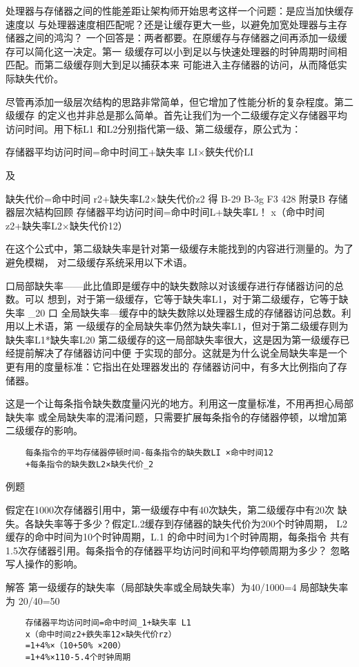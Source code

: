 处理器与存储器之间的性能差距让架构师开始思考这样一个问题：是应当加快缓存速度以
与处理器速度相匹配呢？还是让缓存更大一些，以避免加宽处理器与主存储器之间的鸿沟？
一个回答是：两者都要。在原缓存与存储器之间再添加一级缓存可以简化这一决定。第一
级缓存可以小到足以与快速处理器的时钟周期时间相匹配。而第二级缓存则大到足以捕获本来
可能进入主存储器的访问，从而降低实际缺失代价。

尽管再添加一级层次结构的思路非常简单，但它增加了性能分析的复杂程度。第二级缓存
的定义也并非总是那么简单。首先让我们为一个二级缓存定义存储器平均访问时间。用下标L1
和L2分别指代第一级、第二级缓存，原公式为：

存储器平均访问时间=命中时间工+缺失率 LI×鋏失代价LI

及

缺失代价=命中时间 r2+缺失率L2×缺失代价z2
得
B-29
B-3g
F3
428
附录B 存储器层次結构回顾
存储器平均访问时间=命中时间L+缺失率L！
x（命中时间 z2+缺失率L2×缺失代价12）

在这个公式中，第二级缺失率是针对第一级缓存未能找到的内容进行测量的。为了避免模糊，
对二级缓存系统采用以下术语。

口局部缺失率——此比值即是缓存中的缺失数除以对该缓存进行存储器访问的总数。可以
想到，对于第一级缓存，它等于缺失率L1，对于第二级缓存，它等于缺失率 \_20
口 全局缺失率—缓存中的缺失数除以处理器生成的存储器访问总数。利用以上术语，第
一级缓存的全局缺失率仍然为缺失率L1，但对于第二级缓存则为缺失率L1*缺失率L20
第二级缓存的这一局部缺失率很大，这是因为第一级缓存已经提前解决了存储器访问中便
于实现的部分。这就是为什么说全局缺失率是一个更有用的度量标准：它指出在处理器发出的
存储器访问中，有多大比例指向了存储器。

这是一个让每条指令缺失数度量闪光的地方。利用这一度量标准，不用再担心局部缺失率
或全局缺失率的混淆问题，只需要扩展每条指令的存储器停顿，以增加第二级缓存的影响。
\begin{verbatim}
    每条指令的平均存储器停顿时间-每条指令的缺失数LI ×命中时间12
    +每条指令的缺失数L2×缺失代价_2
\end{verbatim}

例题


假定在1000次存储器引用中，第一级缓存中有40次缺失，第二级缓存中有20次
缺失。各缺失率等于多少？假定L.2缓存到存储器的缺失代价为200个时钟周期，
L2缓存的命中时间为10个时钟周期，L.1 的命中时间为1个时钟周期，每条指令
共有1.5次存储器引用。每条指令的存储器平均访问时间和平均停顿周期为多少？
忽略写人操作的影响。

解答
第一级缓存的缺失率（局部缺失率或全局缺失率）为40/1000=4%
局部缺失率为 20/40=50%
\begin{verbatim}
    存储器平均访问时间=命中时间_1+缺失率 L1
    x（命中时间z2+鉄失率12×缺失代价rz）
    =1+4%×（10+50% ×200）
    =1+4%×110-5.4个时钟周期
\end{verbatim}

